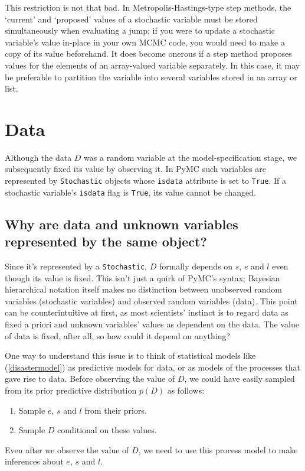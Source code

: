 This restriction is not that bad. In Metropolis-Hastings-type step methods, the `current' and `proposed' values of a stochastic variable must be stored simultaneously when evaluating a jump; if you were to update a stochastic variable's value in-place in your own MCMC code, you would need to make a copy of its value beforehand. It does become onerous if a step method proposes values for the elements of an array-valued variable separately. In this case, it may be preferable to partition the variable into several variables stored in an array or list.

\section{Data}

Although the data $D$ was a random variable at the model-specification stage, we subsequently fixed its value by observing it. In PyMC such variables are represented by \texttt{Stochastic} objects whose \texttt{isdata} attribute is set to \texttt{True}. If a stochastic variable's \texttt{isdata} flag is \texttt{True}, its value cannot be changed.

\subsection{Why are data and unknown variables represented by the same object?}
Since it's represented by a \texttt{Stochastic}, $D$ formally depends on $s$, $e$ and $l$ even though its value is fixed. This isn't just a quirk of PyMC's syntax; Bayesian hierarchical notation itself makes no distinction between unobserved random variables (stochastic variables) and observed random variables (data). This point can be counterintuitive at first, as most scientists' instinct is to regard data as fixed a priori and unknown variables' values as dependent on the data. The value of data is fixed, after all, so how could it depend on anything?

One way to understand this issue is to think of statistical models like (\ref{disastermodel}) as predictive models for data, or as models of the processes that gave rise to data. Before observing the value of $D$, we could have easily sampled from its prior predictive distribution $p(D)$ as follows:
\begin{enumerate}
    \item Sample $e$, $s$ and $l$ from their priors.
    \item Sample $D$ conditional on these values.
\end{enumerate}
Even after we observe the value of $D$, we need to use this process model to make inferences about $e$, $s$ and $l$.

